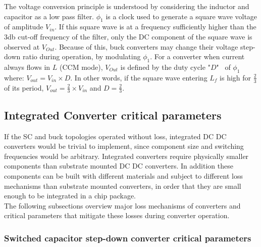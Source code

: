 \documentclass[letterpaper,twocolumn,10pt]{article}
\begin{document}
The voltage conversion principle is understood by considering the inductor and capacitor as a low pass filter. $\phi_1$ is a clock used to generate a square wave voltage of amplitude $V_{in}$. If this square wave is at a frequency sufficiently higher than the 3db cut-off frequency of the filter, only the DC component of the square wave is observed at $V_{Out}$. Because of this, buck converters may change their voltage step-down ratio during operation, by modulating $\phi_1$. For a converter when current always flows in $L$ (CCM mode), $V_{Out}$ is defined by the duty cycle "$D$"~\cite{Kurson2006} of $\phi_1$ where: $V_{out} = V_{in} \times D$. In other words, if the square wave entering $L_f$ is high for $\frac{2}{3}$ of its period, $V_{out} = \frac{2}{3}\times V_{in}$ and $D = \frac{2}{3}$.\\ 

\subsection{Integrated Converter critical parameters}
If the SC and buck topologies operated without loss, integrated DC DC converters would be trivial to implement, since component size and switching frequencies would be arbitrary. Integrated converters require physically smaller components than substrate mounted DC DC converters. In addition these components can be built with different materials and subject to different loss mechanisms than substrate mounted converters, in order that they are small enough to be integrated in a chip package.\\
The following subsections overview major loss mechanisms of converters and critical parameters that mitigate these losses during converter operation.

\subsubsection{Switched capacitor step-down converter critical parameters}
\end{document}
